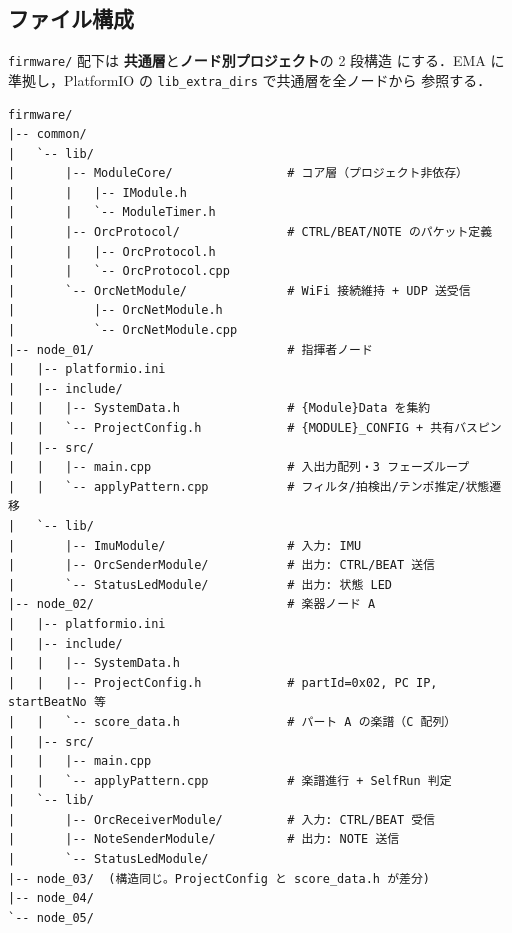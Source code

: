 \documentclass[lualatex,book,paper=a4paper,jafontsize=11.5pt,jafontscale=1.05]{jlreq}
\begin{document}
\subsection{ファイル構成}\label{subsec:file-tree}

\texttt{firmware/} 配下は \textbf{共通層}と\textbf{ノード別プロジェクト}の 2 段構造
にする．EMA に準拠し，PlatformIO の \texttt{lib\_extra\_dirs} で共通層を全ノードから
参照する．

\begin{tcolorbox}[colback=codebg,colframe=accentblue,boxrule=0.5pt,arc=2pt,breakable,
  left=4pt,right=4pt,top=8pt,bottom=4pt,
  title={firmware/ ディレクトリ構成（抜粋）},
  fonttitle=\bfseries\small,coltitle=white,
  attach boxed title to top left={xshift=4mm,yshift*=-2mm},
  boxed title style={colback=accentblue,colframe=accentblue,sharp corners=northwest}]
\begin{Verbatim}[fontsize=\footnotesize,xleftmargin=2pt]
firmware/
|-- common/
|   `-- lib/
|       |-- ModuleCore/                # コア層（プロジェクト非依存）
|       |   |-- IModule.h
|       |   `-- ModuleTimer.h
|       |-- OrcProtocol/               # CTRL/BEAT/NOTE のパケット定義
|       |   |-- OrcProtocol.h
|       |   `-- OrcProtocol.cpp
|       `-- OrcNetModule/              # WiFi 接続維持 + UDP 送受信
|           |-- OrcNetModule.h
|           `-- OrcNetModule.cpp
|-- node_01/                           # 指揮者ノード
|   |-- platformio.ini
|   |-- include/
|   |   |-- SystemData.h               # {Module}Data を集約
|   |   `-- ProjectConfig.h            # {MODULE}_CONFIG + 共有バスピン
|   |-- src/
|   |   |-- main.cpp                   # 入出力配列・3 フェーズループ
|   |   `-- applyPattern.cpp           # フィルタ/拍検出/テンポ推定/状態遷移
|   `-- lib/
|       |-- ImuModule/                 # 入力: IMU
|       |-- OrcSenderModule/           # 出力: CTRL/BEAT 送信
|       `-- StatusLedModule/           # 出力: 状態 LED
|-- node_02/                           # 楽器ノード A
|   |-- platformio.ini
|   |-- include/
|   |   |-- SystemData.h
|   |   |-- ProjectConfig.h            # partId=0x02, PC IP, startBeatNo 等
|   |   `-- score_data.h               # パート A の楽譜（C 配列）
|   |-- src/
|   |   |-- main.cpp
|   |   `-- applyPattern.cpp           # 楽譜進行 + SelfRun 判定
|   `-- lib/
|       |-- OrcReceiverModule/         # 入力: CTRL/BEAT 受信
|       |-- NoteSenderModule/          # 出力: NOTE 送信
|       `-- StatusLedModule/
|-- node_03/  (構造同じ。ProjectConfig と score_data.h が差分)
|-- node_04/
`-- node_05/
\end{Verbatim}
\end{tcolorbox}
\end{document}
